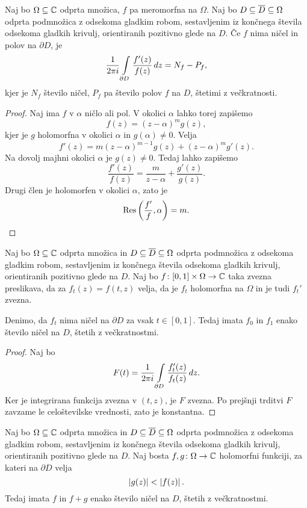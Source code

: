 \begin{izrek}
Naj bo $\Omega \subseteq \mathbb{C}$ odprta množica, $f$ pa meromorfna na
$\Omega$. Naj bo $D \subseteq \overline{D} \subseteq \Omega$ odprta
podmnožica z odsekoma gladkim robom, sestavljenim iz končnega
števila odsekoma gladkih krivulj, orientiranih pozitivno glede na
$D$. Če $f$ nima ničel in polov na $\partial D$, je
\[
\frac{1}{2 \pi i} \int\limits_{\partial D} \frac{f'(z)}{f(z)}\,dz =
N_f - P_f,
\]
kjer je $N_f$ število ničel, $P_f$ pa število polov $f$ na $D$,
štetimi z večkratnosti.
\end{izrek}

\begin{proof}
Naj ima $f$ v $\alpha$ ničlo ali pol. V okolici $\alpha$ lahko
torej zapišemo
\[
f(z) = (z - \alpha)^m g(z),
\]
kjer je $g$ holomorfna v okolici $\alpha$ in $g(\alpha) \ne 0$.
Velja
\[
f'(z) = m (z - \alpha)^{m-1} g(z) + (z - \alpha)^m g'(z).
\]
Na dovolj majhni okolici $\alpha$ je $g(z) \ne 0$. Tedaj lahko
zapišemo
\[
\frac{f'(z)}{f(z)} = \frac{m}{z - \alpha} + \frac{g'(z)}{g(z)}.
\]
Drugi člen je holomorfen v okolici $\alpha$, zato je
\[
\operatorname{Res}\left(\frac{f'}{f}, \alpha\right) = m. \qedhere
\]
\end{proof}

\begin{izrek}[Rouché]
Naj bo $\Omega \subseteq \mathbb{C}$ odprta množica in
$D \subseteq \overline{D} \subseteq \Omega$ odprta podmnožica z
odsekoma gladkim robom, sestavljenim iz končnega števila odsekoma
gladkih krivulj, orientiranih pozitivno glede na $D$. Naj bo
$f \colon [0, 1] \times \Omega \to \mathbb{C}$ taka zvezna preslikava, da
za $f_t(z) = f(t,z)$ velja, da je $f_t$ holomorfna na $\Omega$ in
je tudi $f_t'$ zvezna.

Denimo, da $f_t$ nima ničel na $\partial D$
za vsak $t \in [0, 1]$. Tedaj imata $f_0$ in $f_1$ enako število
ničel na $D$, štetih z večkratnostmi.
\end{izrek}

\begin{proof}
Naj bo
\[
F(t) =
\frac{1}{2 \pi i} \int\limits_{\partial D} \frac{f_t'(z)}{f_t(z)}\,dz.
\]
Ker je integrirana funkcija zvezna v $(t, z)$, je $F$ zvezna. Po
prejšnji trditvi $F$ zavzame le celoštevilske vrednosti, zato je
konstantna.
\end{proof}

\begin{posledica}
Naj bo $\Omega \subseteq \mathbb{C}$ odprta množica in
$D \subseteq \overline{D} \subseteq \Omega$ odprta podmnožica z
odsekoma gladkim robom, sestavljenim iz končnega števila odsekoma
gladkih krivulj, orientiranih pozitivno glede na $D$. Naj bosta
$f, g \colon \Omega \to \mathbb{C}$ holomorfni funkciji, za kateri na
$\partial D$ velja
\[
\left\lvert g(z)\right\rvert < \left\lvert f(z)\right\rvert.
\]
Tedaj imata $f$ in $f+g$ enako število ničel na $D$, štetih z
večkratnostmi.
\end{posledica}

